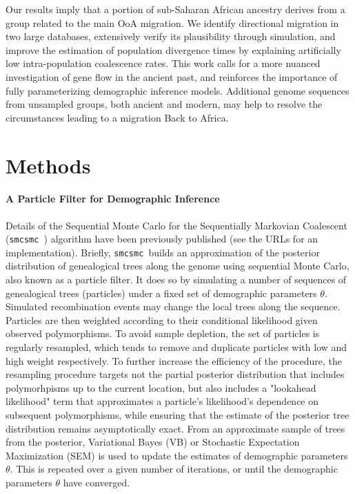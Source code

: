 \documentclass{article}
\newcommand{\SMC}{{\tt smcsmc }}
\begin{document}
Our results imply that a portion of sub-Saharan African ancestry derives from a group related to the main OoA migration. We identify directional migration in two large databases, extensively verify its plausibility through simulation, and improve the estimation of population divergence times by explaining artificially low intra-population coalescence rates. This work calls for a more nuanced investigation of gene flow in the ancient past, and reinforces the importance of fully parameterizing demographic inference models. Additional genome sequences from unsampled groups, both ancient and modern, may help to resolve the circumstances leading to a migration Back to Africa.

\section{Methods}


\paragraph{A Particle Filter for Demographic Inference} Details of the Sequential Monte Carlo for the Sequentially Markovian Coalescent (\SMC) algorithm have been previously published \cite{Henderson2018} (see the URLs for an implementation). Briefly, \SMC builds an approximation of the posterior distribution of genealogical trees along the genome using sequential Monte Carlo, also known as a particle filter. It does so by simulating a number of sequences of genealogical trees (particles) under a fixed set of demographic parameters $\theta$. Simulated recombination events may change the local trees along the sequence. Particles are then weighted according to their conditional likelihood given observed polymorphisms.  To avoid sample depletion, the set of particles is regularly resampled, which tends to remove and duplicate particles with low and high weight respectively.  To further increase the efficiency of the procedure, the
resampling procedure targets not the partial posterior distribution that includes polymorhpisms up to the current location,
but also includes a "lookahead likelihood" term that approximates a particle's likelihood's dependence on subsequent polymorphisms,
while ensuring that the estimate of the posterior tree distribution remains asymptotically exact.  From an approximate sample
of trees from the posterior, Variational Bayes (VB) or Stochastic Expectation Maximization (SEM) is used to update the estimates of demographic parameters $\theta$. This is repeated over a given number of iterations, or until the demographic parameters $\theta$ have converged.
\end{document}
